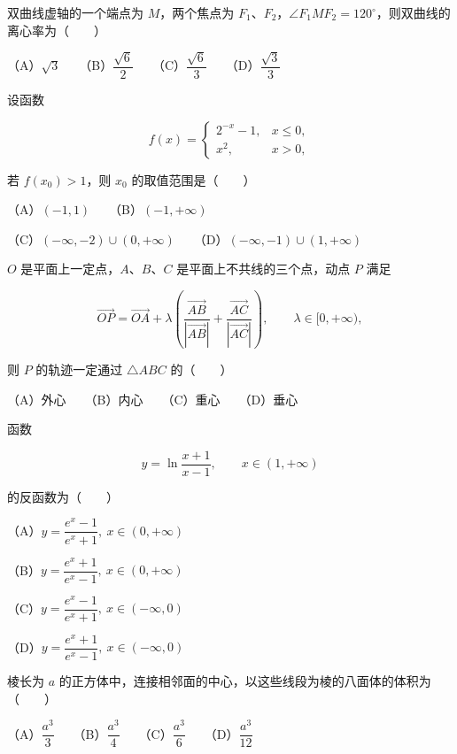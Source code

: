 \begin{question}
双曲线虚轴的一个端点为 $M$，两个焦点为 $F_1\text{、}F_2$，$\angle F_1MF_2=120^\circ$，则双曲线的离心率为\mbox{（　　）}

（A）$\sqrt3$　　（B）$\dfrac{\sqrt6}{2}$　　（C）$\dfrac{\sqrt6}{3}$　　（D）$\dfrac{\sqrt3}{3}$

\end{question}
\begin{question}
设函数

\nopagebreak[4]
\[
f(x)=
\begin{cases}
2^{-x}-1,&x\leqslant0,\\
x^2,&x>0,
\end{cases}
\]

若 $f(x_0)>1$，则 $x_0$ 的取值范围是\mbox{（　　）}

（A）$(-1,1)$　　（B）$(-1,+\infty)$

（C）$(-\infty,-2)\cup(0,+\infty)$　　（D）$(-\infty,-1)\cup(1,+\infty)$

\end{question}
\begin{question}
$O$ 是平面上一定点，$A\text{、}B\text{、}C$ 是平面上不共线的三个点，动点 $P$ 满足

\nopagebreak[4]
\[
\overrightarrow{OP}
=\overrightarrow{OA}
+\lambda\left(
\frac{\overrightarrow{AB}}{|\overrightarrow{AB}|}
+\frac{\overrightarrow{AC}}{|\overrightarrow{AC}|}
\right),\qquad \lambda\in[0,+\infty),
\]

则 $P$ 的轨迹一定通过 $\triangle ABC$ 的\mbox{（　　）}

（A）外心　　（B）内心　　（C）重心　　（D）垂心

\end{question}
\begin{question}
函数

\nopagebreak[4]
\[
y=\ln\frac{x+1}{x-1},\qquad x\in(1,+\infty)
\]

的反函数为\mbox{（　　）}

（A）$y=\dfrac{e^x-1}{e^x+1},\ x\in(0,+\infty)$

（B）$y=\dfrac{e^x+1}{e^x-1},\ x\in(0,+\infty)$

（C）$y=\dfrac{e^x-1}{e^x+1},\ x\in(-\infty,0)$

（D）$y=\dfrac{e^x+1}{e^x-1},\ x\in(-\infty,0)$

\end{question}
\begin{question}
棱长为 $a$ 的正方体中，连接相邻面的中心，以这些线段为棱的八面体的体积为\mbox{（　　）}

（A）$\dfrac{a^3}{3}$　　（B）$\dfrac{a^3}{4}$　　（C）$\dfrac{a^3}{6}$　　（D）$\dfrac{a^3}{12}$

\end{question}
